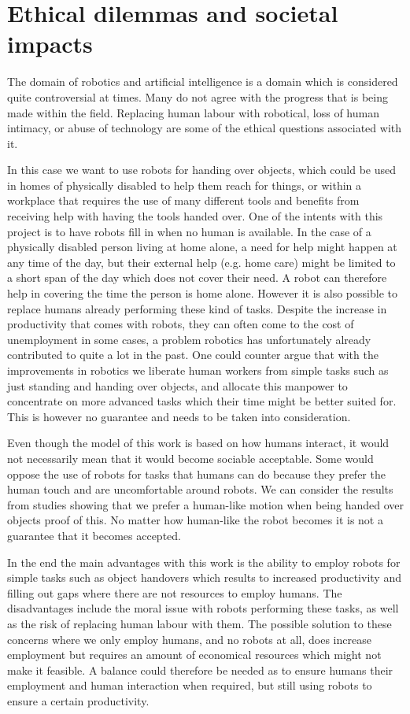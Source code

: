 
\section{Ethical dilemmas and societal impacts}

The domain of robotics and artificial intelligence is a domain which is considered quite controversial at times. Many do not agree with the progress that is being made within the field. Replacing human labour with robotical, loss of human intimacy, or abuse of technology are some of the ethical questions associated with it.

In this case we want to use robots for handing over objects, which could be used in homes of physically disabled to help them reach for things, or within a workplace that requires the use of many different tools and benefits from receiving help with having the tools handed over. One of the intents with this project is to have robots fill in when no human is available. In the case of a physically disabled person living at home alone, a need for help might happen at any time of the day, but their external help (e.g. home care) might be limited to a short span of the day which does not cover their need. A robot can therefore help in covering the time the person is home alone. However it is also possible to replace humans already performing these kind of tasks. Despite the increase in productivity that comes with robots, they can often come to the cost of unemployment in some cases, a problem robotics has unfortunately already contributed to quite a lot in the past. One could counter argue that with the improvements in robotics we liberate human workers from simple tasks such as just standing and handing over objects, and allocate this manpower to concentrate on more advanced tasks which their time might be better suited for. This is however no guarantee and needs to be taken into consideration.

Even though the model of this work is based on how humans interact, it would not necessarily mean that it would become sociable acceptable. Some would oppose the use of robots for tasks that humans can do because they prefer the human touch and are uncomfortable around robots. We can consider the results from studies showing that we prefer a human-like motion when being handed over objects proof of this. No matter how human-like the robot becomes it is not a guarantee that it becomes accepted.

In the end the main advantages with this work is the ability to employ robots for simple tasks such as object handovers which results to increased productivity and filling out gaps where there are not resources to employ humans. The disadvantages include the moral issue with robots performing these tasks, as well as the risk of replacing human labour with them. The possible solution to these concerns where we only employ humans, and no robots at all, does increase employment but requires an amount of economical resources which might not make it feasible. A balance could therefore be needed as to ensure humans their employment and human interaction when required, but still using robots to ensure a certain productivity.



